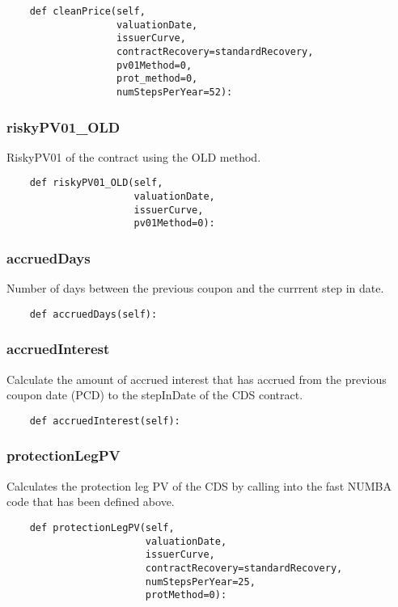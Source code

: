 \documentclass[twoside,11pt]{book}
\begin{document}
\begin{lstlisting}
    def cleanPrice(self,
                   valuationDate,
                   issuerCurve,
                   contractRecovery=standardRecovery,
                   pv01Method=0,
                   prot_method=0,
                   numStepsPerYear=52):
\end{lstlisting}

\subsubsection*{{\bf riskyPV01\_OLD}}
RiskyPV01 of the contract using the OLD method.  

\begin{lstlisting}
    def riskyPV01_OLD(self,
                      valuationDate,
                      issuerCurve,
                      pv01Method=0):
\end{lstlisting}

\subsubsection*{{\bf accruedDays}}
Number of days between the previous coupon and the currrent step  in date.  

\begin{lstlisting}
    def accruedDays(self):
\end{lstlisting}

\subsubsection*{{\bf accruedInterest}}
Calculate the amount of accrued interest that has accrued from the previous coupon date (PCD) to the stepInDate of the CDS contract.  

\begin{lstlisting}
    def accruedInterest(self):
\end{lstlisting}

\subsubsection*{{\bf protectionLegPV}}
Calculates the protection leg PV of the CDS by calling into the fast NUMBA code that has been defined above.  

\begin{lstlisting}
    def protectionLegPV(self,
                        valuationDate,
                        issuerCurve,
                        contractRecovery=standardRecovery,
                        numStepsPerYear=25,
                        protMethod=0):
\end{lstlisting}
\end{document}
